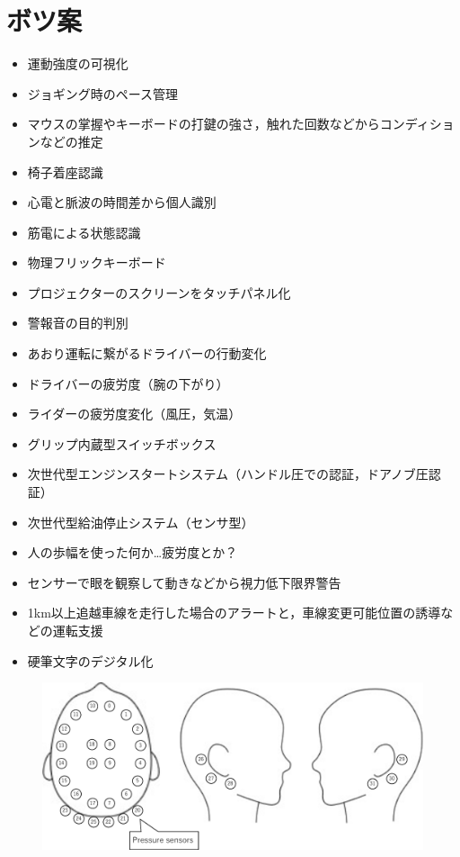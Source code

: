 \documentclass[a4j,twocolumn,10pt]{jarticle}
\begin{document}
\section{ボツ案}
\begin{itemize}
  \item 運動強度の可視化
  \item ジョギング時のペース管理
  \item マウスの掌握やキーボードの打鍵の強さ，触れた回数などからコンディションなどの推定
  \item 椅子着座認識
  \item 心電と脈波の時間差から個人識別
  \item 筋電による状態認識
  \item 物理フリックキーボード
  \item プロジェクターのスクリーンをタッチパネル化
  \item 警報音の目的判別
  \item あおり運転に繋がるドライバーの行動変化
  \item ドライバーの疲労度（腕の下がり）
  \item ライダーの疲労度変化（風圧，気温）
  \item グリップ内蔵型スイッチボックス
  \item 次世代型エンジンスタートシステム（ハンドル圧での認証，ドアノブ圧認証）
  \item 次世代型給油停止システム（センサ型）
  \item 人の歩幅を使った何か…疲労度とか？
  \item センサーで眼を観察して動きなどから視力低下限界警告
  \item 1km以上追越車線を走行した場合のアラートと，車線変更可能位置の誘導などの運転支援
  \item 硬筆文字のデジタル化
\end{itemize}

\begin{figure}[t]
  \begin{center}
    \includegraphics[width=1\textwidth]{Figure_1.eps}
    \caption{}
    \label{fig}
  \end{center}
\end{figure}
\end{document}
